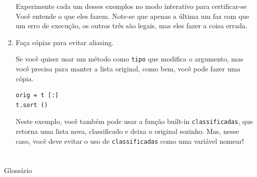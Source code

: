 \documentclass[10pt]{book}
\begin{document}
\begin{enumerate}
Experimente cada um desses exemplos no modo interativo para certificar-se
Você entende o que eles fazem. Note-se que apenas a última
um faz com que um erro de execução, os outros três são legais, mas eles
fazer a coisa errada.


\item Faça cópias para evitar aliasing.

Se você quiser usar um método como {\tt tipo} que modifica
o argumento, mas você precisa para manter a lista original, como
bem, você pode fazer uma cópia.

\begin{verbatim}
orig = t [:]
t.sort ()
\end{verbatim}

Neste exemplo, você também pode usar a função built-in {\tt classificadas},
que retorna uma lista nova, classificado e deixa o original sozinho.
Mas, nesse caso, você deve evitar o uso de {\tt classificadas} como uma variável
nomear!

\end{enumerate}



\section{} Glossário
\end{document}
